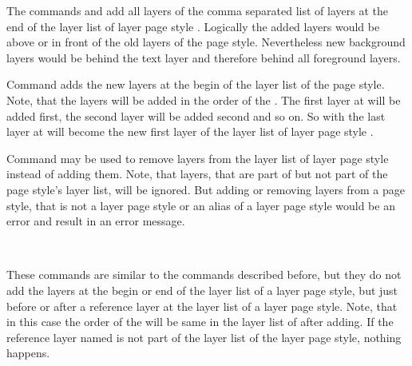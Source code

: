 The commands  and 
add all layers of the comma separated list of layers  at
the end of the layer list of layer page style . Logically the added layers would be above or in front of the old
layers of the page style. Nevertheless new background layers would be behind
the text layer and therefore behind all foreground layers.

Command  adds the new layers at the begin
of the layer list of the page style. Note, that the layers
will be added in the order of the . The first layer at
 will be added first, the second layer will be added second
and so on. So with  the last layer at
 will become the new first layer of the layer list of layer
page style .

Command  may be used to remove layers from
the layer list of layer page style  instead of adding
them. Note, that layers, that are part of  but not part of
the page style's layer list, will be ignored. But adding or removing layers
from a page style, that is not a layer page style or an alias of a layer page
style would be an error and result in an error message.%
%
%
%

\begin{Declaration}
  \\
\end{Declaration}
%
%
These commands are similar to the commands described before, but they do not
add the layers at the begin or end of the layer list of a layer page style,
but just before or after a reference layer at the layer list of a layer page
style. Note, that in this case the order of the  will be
same in the layer list of  after adding. If the
reference layer named  is not part of the layer
list of the layer page style, nothing happens.%
%

